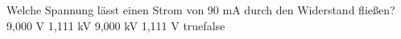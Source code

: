     {Welche Spannung lässt einen Strom von 90 mA durch den Widerstand fließen?}
    {9,000 V}
    {1,111 kV}
    {9,000 kV}
    {1,111 V}
    {true}{false}